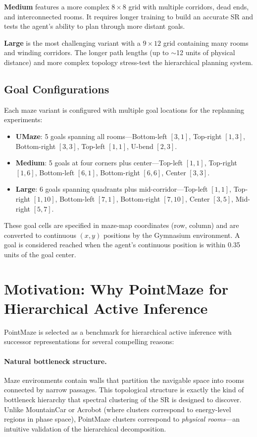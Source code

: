 \documentclass[11pt,a4paper]{article}
\begin{document}
\textbf{Medium} features a more complex $8 \times 8$ grid with multiple corridors, dead ends, and interconnected rooms.
It requires longer training to build an accurate SR and tests the agent's ability to plan through more distant goals.

\textbf{Large} is the most challenging variant with a $9 \times 12$ grid containing many rooms and winding corridors.
The longer path lengths (up to $\sim$12 units of physical distance) and more complex topology stress-test the hierarchical planning system.

\subsection{Goal Configurations}
\label{sec:goal_configs}

Each maze variant is configured with multiple goal locations for the replanning experiments:

\begin{itemize}[noitemsep]
    \item \textbf{UMaze}: 5 goals spanning all rooms---Bottom-left $[3,1]$, Top-right $[1,3]$, Bottom-right $[3,3]$, Top-left $[1,1]$, U-bend $[2,3]$.
    \item \textbf{Medium}: 5 goals at four corners plus center---Top-left $[1,1]$, Top-right $[1,6]$, Bottom-left $[6,1]$, Bottom-right $[6,6]$, Center $[3,3]$.
    \item \textbf{Large}: 6 goals spanning quadrants plus mid-corridor---Top-left $[1,1]$, Top-right $[1,10]$, Bottom-left $[7,1]$, Bottom-right $[7,10]$, Center $[3,5]$, Mid-right $[5,7]$.
\end{itemize}

These goal cells are specified in maze-map coordinates (row, column) and are converted to continuous $(x, y)$ positions by the Gymnasium environment.
A goal is considered reached when the agent's continuous position is within 0.35 units of the goal center.

\section{Motivation: Why PointMaze for Hierarchical Active Inference}
\label{sec:motivation}

PointMaze is selected as a benchmark for hierarchical active inference with successor representations for several compelling reasons:

\paragraph{Natural bottleneck structure.}
Maze environments contain walls that partition the navigable space into rooms connected by narrow passages.
This topological structure is exactly the kind of bottleneck hierarchy that spectral clustering of the SR is designed to discover.
Unlike MountainCar or Acrobot (where clusters correspond to energy-level regions in phase space), PointMaze clusters correspond to \emph{physical rooms}---an intuitive validation of the hierarchical decomposition.
\end{document}
